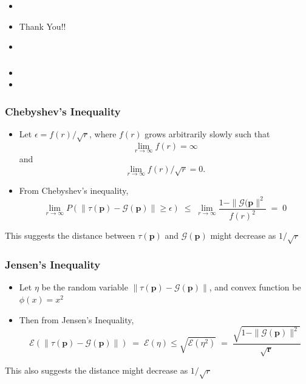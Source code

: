 \documentclass[aspectratio=169]{beamer}
\begin{document}
  \begin{frame}
    \frametitle{}
    \begin{itemize}
      \item{}
      \item{Thank You!!} 
      \item{}
    \end{itemize}
  \end{frame}
  
  \begin{frame}
    \frametitle{}
    \begin{itemize}
      \item{} 
      \item{}
    \end{itemize}
  \end{frame}
  
  
  
  
 
  \begin{frame}
    \frametitle{Chebyshev's Inequality}
    \begin{itemize}
      \item{Let $\epsilon = f(r)/\sqrt{r}$, where $f(r)$ grows arbitrarily slowly such that 
	\[
	\lim_{r \to \infty} f(r)  =  \infty
	\]
	and 
	\[
	\lim_{r \to \infty} f(r)/\sqrt{r}  =  0.
	\]
      }
      \item{From Chebyshev's inequality,
	\[
	  \lim_{r \to \infty} P(\| \tau (\bm{p}) - \mathcal{G}(\bm{p}) \| \geq \epsilon) \; \leq \; 
	  \lim_{r \to \infty}\frac{1 - \|\mathcal{G}(\bm{p}\|^2} {{f(r)}^2} \; = \; 0
	\]
      }      
    \end{itemize}
    This suggests the distance between $\tau(\bm{p})$ and $\mathcal{G}(\bm{p})$ might decrease as $1/\sqrt{r}$
  \end{frame}
  
  \begin{frame}
    \frametitle{Jensen's Inequality}
    \begin{itemize}
      \item{Let $\eta$ be the random variable $\| \tau (\bm{p}) - \mathcal{G}(\bm{p}) \|$, and convex function be $\phi (x) = x^2$}
      \item{Then from Jensen's Inequality, 
	\[
	  \mathcal{E}(\| \tau (\bm{p}) - \mathcal{G}(\bm{p}) \|) \;=\; \mathcal{E}(\eta) \leq \sqrt{\mathcal{E}(\eta^2)} \;=\; 
	  \frac{\sqrt{1 - \|\mathcal{G}(\bm{p})\|^2}}{\sqrt{\bm{r}}}
	\]
      }
    \end{itemize}
    This also suggests the distance might decrease as $1/\sqrt{r}$
  \end{frame}
  
\end{document}
